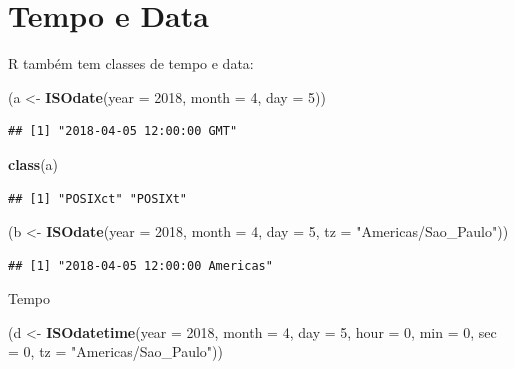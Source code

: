 \documentclass[]{book}
\newenvironment{Shaded}{\begin{snugshade}}{\end{snugshade}}
\newcommand{\KeywordTok}[1]{\textcolor[rgb]{0.13,0.29,0.53}{\textbf{#1}}}
\newcommand{\DataTypeTok}[1]{\textcolor[rgb]{0.13,0.29,0.53}{#1}}
\newcommand{\DecValTok}[1]{\textcolor[rgb]{0.00,0.00,0.81}{#1}}
\newcommand{\StringTok}[1]{\textcolor[rgb]{0.31,0.60,0.02}{#1}}
\newcommand{\NormalTok}[1]{#1}
\begin{document}
\section{Tempo e Data}\label{tempo-e-data}

R também tem classes de tempo e data:

\begin{Shaded}
\begin{Highlighting}[]
\NormalTok{(a <-}\StringTok{ }\KeywordTok{ISOdate}\NormalTok{(}\DataTypeTok{year =} \DecValTok{2018}\NormalTok{, }\DataTypeTok{month =} \DecValTok{4}\NormalTok{, }\DataTypeTok{day =} \DecValTok{5}\NormalTok{))}
\end{Highlighting}
\end{Shaded}

\begin{verbatim}
## [1] "2018-04-05 12:00:00 GMT"
\end{verbatim}

\begin{Shaded}
\begin{Highlighting}[]
\KeywordTok{class}\NormalTok{(a)}
\end{Highlighting}
\end{Shaded}

\begin{verbatim}
## [1] "POSIXct" "POSIXt"
\end{verbatim}

\begin{Shaded}
\begin{Highlighting}[]
\NormalTok{(b <-}\StringTok{ }\KeywordTok{ISOdate}\NormalTok{(}\DataTypeTok{year =} \DecValTok{2018}\NormalTok{, }\DataTypeTok{month =} \DecValTok{4}\NormalTok{, }\DataTypeTok{day =} \DecValTok{5}\NormalTok{, }\DataTypeTok{tz =} \StringTok{"Americas/Sao_Paulo"}\NormalTok{))}
\end{Highlighting}
\end{Shaded}

\begin{verbatim}
## [1] "2018-04-05 12:00:00 Americas"
\end{verbatim}

Tempo

\begin{Shaded}
\begin{Highlighting}[]
\NormalTok{(d <-}\StringTok{ }\KeywordTok{ISOdatetime}\NormalTok{(}\DataTypeTok{year =} \DecValTok{2018}\NormalTok{, }\DataTypeTok{month =} \DecValTok{4}\NormalTok{, }\DataTypeTok{day =} \DecValTok{5}\NormalTok{, }\DataTypeTok{hour =} \DecValTok{0}\NormalTok{, }\DataTypeTok{min =} \DecValTok{0}\NormalTok{, }\DataTypeTok{sec =} \DecValTok{0}\NormalTok{,}
                  \DataTypeTok{tz =} \StringTok{"Americas/Sao_Paulo"}\NormalTok{))}
\end{Highlighting}
\end{Shaded}
\end{document}
